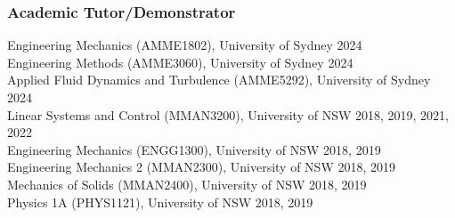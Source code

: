 \documentclass[11pt]{article}       %
\begin{document}
\subsubsection*{Academic Tutor/Demonstrator}
\vspace{-6pt}
Engineering Mechanics (AMME1802), University of Sydney \hfill 2024\\
Engineering Methods (AMME3060), University of Sydney \hfill 2024\\
Applied Fluid Dynamics and Turbulence (AMME5292), University of Sydney \hfill 2024\\
Linear Systems and Control (MMAN3200), University of NSW \hfill 2018, 2019, 2021, 2022\\
Engineering Mechanics (ENGG1300), University of NSW \hfill 2018, 2019 \\
Engineering Mechanics 2 (MMAN2300), University of NSW \hfill 2018, 2019 \\
Mechanics of Solids (MMAN2400), University of NSW \hfill 2018, 2019 \\
Physics 1A (PHYS1121), University of NSW \hfill 2018, 2019 \\

\vspace{-6pt}
\end{document}
